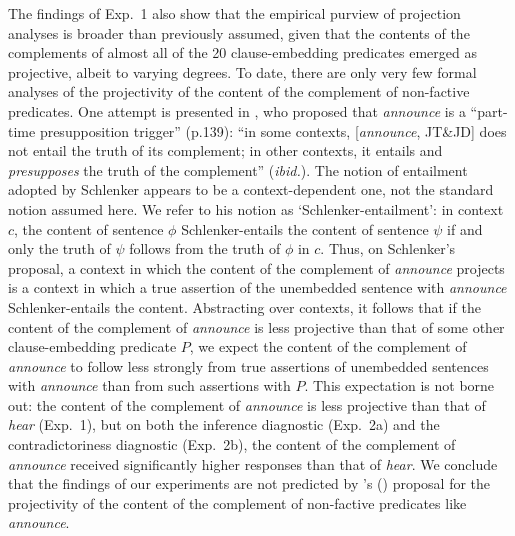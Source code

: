 \documentclass[11pt,fleqn]{article}
\newcommand{\6}{\mbox{$[\hspace*{-.6mm}[$}}
\newcommand{\9}{\mbox{$]\hspace*{-.6mm}]$}}
\newcommand{\citetpos}[1]{\citeauthor{#1}'s (\citeyear{#1})}
\begin{document}
{The findings of Exp.~1 also show that the empirical purview of projection analyses is broader than previously assumed, given that the contents of the complements of almost all of the 20 clause-embedding predicates emerged as projective, albeit to varying degrees. To date, there are only very few formal analyses of the projectivity of the content of the complement of non-factive predicates.  One attempt is presented in \citealt{schlenker10}, who proposed that {\em announce} is a ``part-time presupposition trigger'' (p.139): ``in some contexts, [{\em announce}, JT\&JD] does not entail the truth of its complement; in other contexts, it entails and {\em presupposes} the truth of the complement'' ({\em ibid.}). The notion of entailment adopted by Schlenker appears to be a context-dependent one, not the standard notion assumed here. We refer to his notion as `Schlenker-entailment': in context $c$, the content of sentence $\phi$ Schlenker-entails the content of sentence $\psi$ if and only the truth of $\psi$ follows from the truth of $\phi$ in $c$.  Thus, on Schlenker's proposal, a context in which the content of the complement of {\em announce} projects is a context in which a true assertion of the unembedded sentence with {\em announce} Schlenker-entails the content. Abstracting over contexts, it follows that if the content of the complement of {\em announce} is less projective than that of some other clause-embedding predicate $P$, we expect the content of the complement of {\em announce} to follow less strongly from true assertions of unembedded sentences with {\em announce} than from such assertions with $P$. This expectation is not borne out: the content of the complement of {\em announce} is less projective than that of {\em hear} (Exp.~1), but on both the inference diagnostic (Exp.~2a) and the contradictoriness diagnostic (Exp.~2b), the content of the complement of {\em announce} received significantly higher responses than that of {\em hear}. We conclude that the findings of our experiments are not predicted by \citetpos{schlenker10} proposal for the projectivity of the content of the complement of non-factive predicates like {\em announce}.

}
\end{document}
